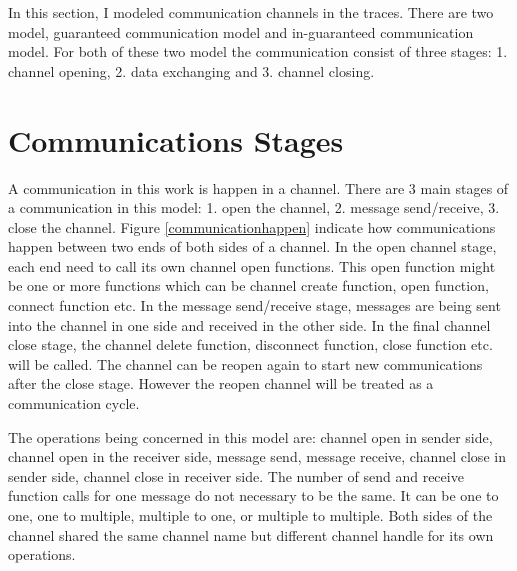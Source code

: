\label{chapter:Mod}
In this section, I modeled communication channels in the traces. There are two model, guaranteed communication model and in-guaranteed communication model. For both of these two model the communication consist of three stages: 1. channel opening, 2. data exchanging and 3. channel closing.

\section{Communications Stages}   
A communication in this work is happen in a channel. There are 3 main stages of a communication in this model: 1. open the channel, 2. message send/receive, 3. close the channel. Figure \ref{communicationhappen} indicate how communications happen between two ends of both sides of a channel. In the open channel stage, each end need to call its own channel open functions. This open function might be one or more functions which can be channel create function, open function, connect function etc.  In the message send/receive stage, messages are being sent into the channel in one side and received in the other side. In the final channel close stage, the channel delete function, disconnect function, close function etc. will be called. The channel can be reopen again to start new communications after the close stage. However the reopen channel will be treated as a communication cycle.

The operations being concerned in this model are: channel open in sender side, channel open in the receiver side, message send, message receive, channel close in sender side, channel close in receiver side. The number of send and receive function calls for one message do not necessary to be the same. It can be one to one, one to multiple, multiple to one, or multiple to multiple. Both sides of the channel shared the same channel name but different channel handle for its own operations.

